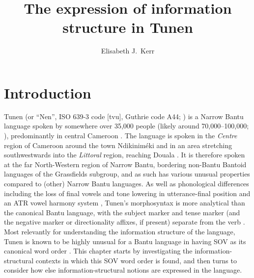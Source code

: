 \documentclass[output=paper,colorlinks,citecolor=brown
]{langscibook}
\author{Elisabeth J.\ Kerr\orcid{0000-0002-0329-269X}\affiliation{Ghent University}}
\title{The expression of information structure in Tunen}
\begin{document}
\maketitle
\label{ch:2}


\section{Introduction}
Tunen (or ``Nen'', ISO 639-3 code [tvu], Guthrie code A44; \citealt{Maho2003, Maho2009}) is a Narrow Bantu language spoken by somewhere over 35,000 people (likely around 70,000–100,000; \citealp[33--34]{KerrFut}), predominantly in central Cameroon \citep{Mous2003, Gordon2005}. The language is spoken in the \textit{Centre} region of Cameroon around the town Ndikiniméki and in an area stretching southwestwards into the \textit{Littoral} region, reaching Douala \citep{Dugast1955, Dugast1971, Mous2003}. It is therefore spoken at the far North-Western region of Narrow Bantu, bordering non-Bantu Bantoid languages of the Grassfields subgroup, and as such has various unusual properties compared to (other) Narrow Bantu languages. As well as phonological differences including the loss of final vowels and tone lowering in utterance-final position and an ATR vowel harmony system \citep{Dugast1971, vanLeynseele1977,vanderHulstEtAl1986, Bancel1991,Mous1986, Mous2003, Boyd2015}, Tunen's morphosyntax is more analytical than the canonical Bantu language, with the subject marker and tense marker (and the negative marker or directionality affixes, if present) separate from the verb \citep{Dugast1971, Mous1997, Mous2003, KongneWelaze2010}. Most relevantly for understanding the information structure of the language, Tunen is known to be highly unusual for a Bantu language in having SOV as its canonical word order \citep{Dugast1971, Bearth2003, Mous1997, Mous2003, Mous2005, Mous2014, Kerr2024, KerrFut}. This chapter starts by investigating the information-structural contexts in  which this SOV word order is found, and then turns to consider how else information-structural notions are expressed in the language.  
 
\end{document}
